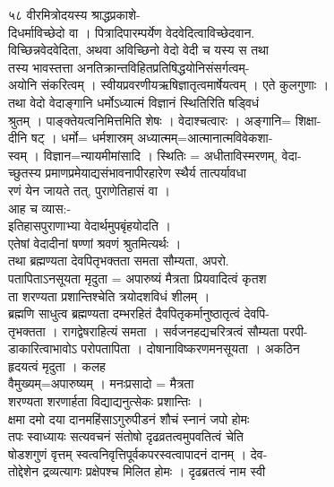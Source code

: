 \documentclass[11pt, openany]{book}
\begin{document}
{{{{{{{{{{{{{{{{{{{{{{{{{{{{{{{{{{{{{{{{{{{{{{{{{{{{{{{{{{{{{{{{{{{{{{{{{{{{{{{{{{{{{{{{{{{{{{{{{{{{{{{{{{{{{{{{{५८ }{ वीरमित्रोदयस्य श्राद्धप्रकाशे-}{\\
दिधर्माविच्छेदो वा । पित्रादिपारम्पर्येण वेदवेदित्वाविच्छेदवान.\\
विच्छिन्नवेदवेदिता, अथवा अविच्छिनो वेदो वेदी च यस्य स }{तथा}{\\
}{तस्य}{ भावस्तत्ता \textbar{}
अनतिक्रान्तविहितप्रतिषिद्धयोनिसंसर्गत्वम्-\\
अयोनि संकरित्वम् । स्वीयप्रवरणीयऋषिज्ञातृत्वमार्षेयत्वम् । एते कुलगुणाः
।\\
}{तथा}{ वेदो वेदाङ्गानि धर्मोऽध्यात्मं विज्ञानं स्थितिरिति षड्विधं\\
श्रुतम् । पाङ्क्तेयत्वनिमित्तमिति शेषः । वेदाश्चत्वारः । अङ्गानि=
शिक्षा-\\
दीनि षट् । धर्मो= धर्मशास्रम् \textbar{} अध्यात्मम्=आत्मानात्मविवेकशा-\\
स्वम् । विज्ञान=न्यायमीमांसादि । स्थितिः = अधीताविस्मरणम्, वेदा-\\
च्छुतस्य प्रमाणप्रमेयाद्यसंभावनापीरहारेण स्थैर्य तात्पर्यावधा\\
रणं येन जायते तत्, पुराणेतिहासं वा ।\\
आह च व्यास:-\\
इतिहासपुराणाभ्या वेदार्थमुपबृंहयोदति ।\\
एतेषां वेदादीनां षण्णां श्रवणं श्रुतमित्यर्थः ।\\
}{तथा}{ ब्रह्मण्यता देवपितृभक्तता समता सौम्यता, अपरो.\\
पतापिताऽनसूयता मृदुता = अपारुष्यं मैत्रता प्रियवादित्वं कृतश\\
ता शरण्यता प्रशान्तिश्चेति त्रयोदशविधं शीलम् ।\\
ब्रह्मणि साधुत्व ब्रह्मण्यता \textbar{} दम्भरहितं
दैवपितृकर्मानुष्ठातृत्वं देवपि-\\
तृभक्तता । रागद्वेषराहित्यं समता । सर्वजनहद्यचरित्रत्वं सौम्यता
\textbar{} परपी-\\
डाकारित्वाभावोऽ परोपतापिता । दोषानाविष्करणमनसूयता । अकठिन\\
हृदयत्वं मृदुता । कलह\\
वैमुख्यम्=अपारुष्यम् । मनःप्रसादो = मैत्रता \textbar{}\\
शरण्यता शरणार्हता \textbar{} विद्याद्यनुत्सेकः प्रशान्तिः ।\\
क्षमा दमो दया दानमहिंसाऽगुरुपीडनं शौचं स्नानं जपो होमः\\
तपः स्वाध्यायः सत्यवचनं संतोषो दृढव्रतत्वमुपवतित्वं चेति\\
षोडशगुणं वृत्तम् \textbar{} स्वत्वनिवृत्तिपूर्वकपरस्वत्वापादनं दानम् ।
देव-\\
तोद्देशेन द्रव्यत्यागः प्रक्षेपश्च मिलित होमः । दृढब्रतत्वं नाम स्वी\\
}}}}}}}}}}}}}}}}}}}}}}}}}}}}}}}}}}}}}}}}}}}}}}}}}}}}}}}}}}}}}}}}}}}}}}}}}}}}}}}}}}}}}}}}}}}}}}}}}}}}}}}}}}}}}}}}}
\end{document}
